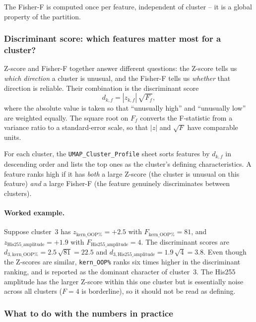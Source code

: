 \documentclass[11pt,a4paper,twoside]{article}
\theoremstyle{remark}
\begin{document}
The Fisher-F is computed once per feature, independent of
cluster -- it is a global property of the partition.

\subsubsection*{Discriminant score: which features matter most for a cluster?}

Z-score and Fisher-F together answer different questions: the
Z-score tells us \emph{which direction} a cluster is unusual, and
the Fisher-F tells us \emph{whether} that direction is reliable.
Their combination is the discriminant score
\begin{equation}
  d_{k,f} = |z_{k,f}|\,\sqrt{F_f},
  \label{eq:discriminant}
\end{equation}
where the absolute value is taken so that ``unusually high'' and
``unusually low'' are weighted equally. The square root on $F_f$
converts the F-statistic from a variance ratio to a standard-error
scale, so that $|z|$ and $\sqrt{F}$ have comparable units.

For each cluster, the \texttt{UMAP\_Cluster\_Profile} sheet sorts
features by $d_{k,f}$ in descending order and lists the top ones
as the cluster's defining characteristics. A feature ranks high if
it has \emph{both} a large Z-score (the cluster is unusual on this
feature) \emph{and} a large Fisher-F (the feature genuinely
discriminates between clusters).

\paragraph{Worked example.}
Suppose cluster~3 has
$z_{\text{kern\_OOP}\%} = +2.5$ with $F_{\text{kern\_OOP}\%} = 81$,
and $z_{\text{His255\_amplitude}} = +1.9$ with
$F_{\text{His255\_amplitude}} = 4$.
The discriminant scores are
$d_{3,\text{kern\_OOP}\%} = 2.5\,\sqrt{81} = 22.5$ and
$d_{3,\text{His255\_amplitude}} = 1.9\,\sqrt{4} = 3.8$.
Even though the Z-scores are similar, \texttt{kern\_OOP\%} ranks
six times higher in the discriminant ranking, and is reported as
the dominant character of cluster~3. The His255 amplitude has the
larger Z-score within this one cluster but is essentially noise
across all clusters ($F = 4$ is borderline), so it should not be
read as defining.

\subsubsection*{What to do with the numbers in practice}
\end{document}
